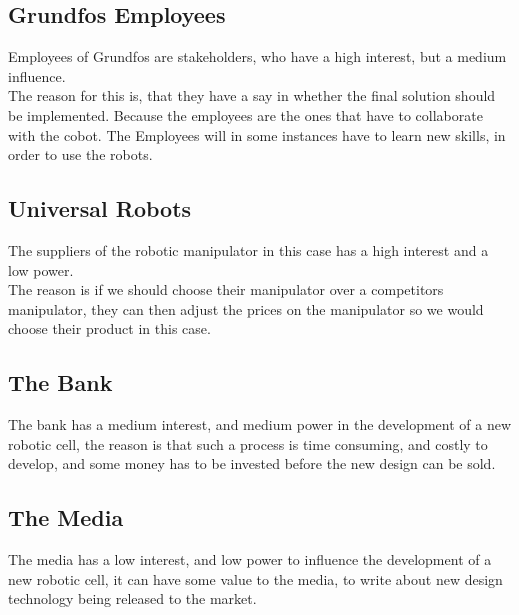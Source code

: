 \subsection{Grundfos Employees}\label{ch:grundfosemp-stake}
Employees of Grundfos are stakeholders, who have a high interest, but a medium influence.\\ The reason for this is, that they have a say in whether the final solution should be implemented. Because the employees are the ones that have to collaborate with the cobot. The Employees will in some instances have to learn new skills, in order to use the robots.

\subsection{Universal Robots}\label{ch:Universalrobots-stake}
The suppliers of the robotic manipulator in this case has a high interest and a low power.\\The reason is if we should choose their manipulator over a competitors manipulator, they can then adjust the prices on the manipulator so we would choose their product in this case. 

\subsection{The Bank}\label{ch:Bank-stake}
The bank has a medium interest, and medium power in the development of a new robotic cell, the reason is that such a process is time consuming, and costly to develop, and some money has to be invested before the new design can be sold.

\subsection{The Media}\label{ch:Media-stake}
The media has a low interest, and low power to influence the development of a new robotic cell, it can have some value to the media, to write about new design technology being released to the market.


